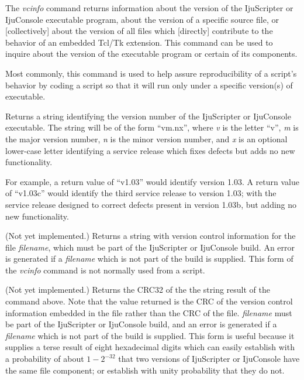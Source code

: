 \begin{tclcommanddescription}
The \emph{vcinfo} command returns information about the version of the
IjuScripter or IjuConsole executable program, about the version of
a specific source file, or [collectively] about the version of all files
which [directly] contribute to the behavior of an embedded Tcl/Tk extension.
This command can be used to
inquire about the version of the executable program or certain of its
components.

Most commonly, this command is used to help assure reproducibility
of a script's behavior by coding a script so that it will
run only under a specific version(s) of executable.

\begin{tclcommandinternaldescription}
Returns a string identifying the version number of the IjuScripter or IjuConsole
executable.  The string will be of the form ``vm.nx'', where \emph{v} is the letter
``v'', \emph{m} is the major version number, \emph{n} is the minor version number, and
\emph{x} is an optional lower-case letter identifying a service release which fixes defects
but adds no new functionality.

For example, a return value of ``v1.03'' would identify version 1.03.  A return
value of ``v1.03c'' would identify the third service release to version 1.03; with
the service release designed to correct defects present in version 1.03b, but adding
no new functionality.
\end{tclcommandinternaldescription}

\begin{tclcommandinternaldescription}
(Not yet implemented.)  Returns a string with version control information for the file
\emph{filename}, which must be part of the IjuScripter or IjuConsole build.
An error is generated if a \emph{filename} which is not part of the build
is supplied.  This form of the \emph{vcinfo} command is not normally used from a script.
\end{tclcommandinternaldescription}

\begin{tclcommandinternaldescription}
(Not yet implemented.)  Returns the CRC32 of the the string result of the command above.
Note that the value returned is the CRC of the version control information embedded in the file
rather than the CRC of the file.
\emph{filename} must be part of the IjuScripter or IjuConsole build, and
an error is generated if a \emph{filename} which is not part of the build is supplied.
This form is
useful because it supplies a terse result of eight hexadecimal digits which can easily
establish with a probability of about $1-2^{-32}$ that two versions of IjuScripter or IjuConsole
have the same file component; or establish with unity probability that they do not.
\end{tclcommandinternaldescription}


\end{tclcommanddescription}
